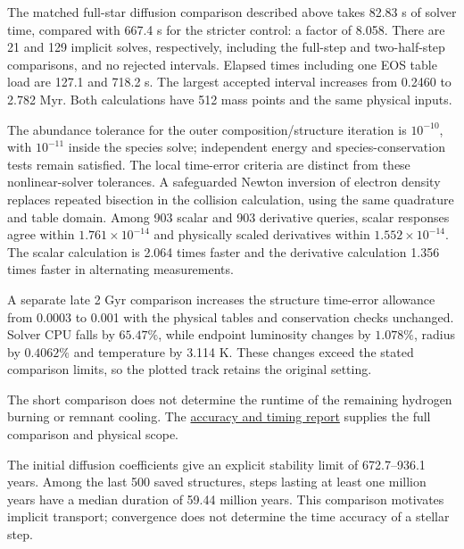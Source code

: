 \documentclass[11pt,letterpaper]{article}
\newcommand{\doc}[2]{\href{https://github.com/oklo/ember/blob/codex/atmosphere5000-density-checks/#1}{#2}}
\begin{document}
The matched full-star diffusion comparison described above takes 82.83 s
of solver time, compared with 667.4 s for the stricter control: a factor
of 8.058. There are 21 and 129 implicit solves, respectively, including the
full-step and two-half-step comparisons, and no rejected intervals.
Elapsed times including one EOS table load are 127.1 and 718.2 s.
The largest accepted interval increases from 0.2460 to 2.782 Myr.
Both calculations have 512 mass points and the same physical inputs.

The abundance tolerance for the outer composition/structure iteration is
$10^{-10}$, with $10^{-11}$ inside the species solve; independent energy
and species-conservation tests remain satisfied. The local time-error
criteria are distinct from these nonlinear-solver tolerances. A safeguarded
Newton inversion of electron density replaces repeated bisection in the
collision calculation, using the same quadrature and table domain.
Among 903 scalar and 903 derivative queries, scalar responses agree within
$1.761\times10^{-14}$ and physically scaled derivatives within
$1.552\times10^{-14}$. The scalar calculation is 2.064 times faster and
the derivative calculation 1.356 times faster in alternating measurements.

A separate late 2 Gyr comparison increases the structure time-error
allowance from 0.0003 to 0.001 with the physical tables and conservation
checks unchanged. Solver CPU falls by $65.47\%$, while endpoint
luminosity changes by $1.078\%$, radius by $0.4062\%$ and temperature
by 3.114 K. These changes exceed the stated comparison limits, so the
plotted track retains the original setting.

The short comparison does not determine
the runtime of the remaining hydrogen burning or remnant cooling.
The \doc{docs/PRODUCTION_ACCURACY.md}{accuracy and timing report} supplies
the full comparison and physical scope.

The initial diffusion coefficients give an explicit stability limit of
672.7--936.1 years. Among the last 500 saved structures, steps lasting at least
one million years have a median duration of 59.44 million years. This
comparison motivates implicit transport; convergence does not determine
the time accuracy of a stellar step.
\end{document}
